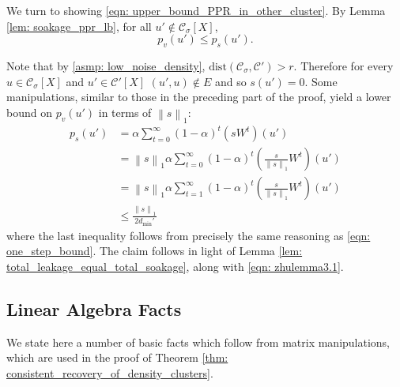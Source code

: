 \documentclass[11pt,twoside]{article}
\newcommand{\norm}[1]{\left\lVert#1\right\rVert}
\newcommand{\1}{\mathbf{1}}
\newcommand{\dist}{\mathrm{dist}}
\newcommand{\pbf}{p}        %
\newcommand{\Xbf}{X}             %
\newcommand{\Wbf}{W}
\newcommand{\Cset}{\mathcal{C}}
\newcommand{\Csig}{\Cset_{\sigma}}
\newcommand{\degminpr}{d_{\min}'}
\begin{document}
	We turn to showing \eqref{eqn: upper_bound_PPR_in_other_cluster}. By Lemma \ref{lem: soakage_ppr_lb}, for all $u' \not\in \Csig[\Xbf]$,
	\begin{equation*}
	\pbf_v(u') \leq \pbf_s(u').
	\end{equation*}
	
	Note that by \ref{asmp: low_noise_density}, $\dist(\Csig,\Cset') > r$. Therefore for every $u \in \Csig[\Xbf]$ and $u' \in \Cset'[\Xbf]$ $(u',u) \not\in E$ and so $s(u') = 0$. Some manipulations, similar to those in the preceding part of the proof, yield a lower bound on $\pbf_v(u')$ in terms of $\norm{s}_1$:
	\begin{align*}
	\pbf_s(u') & = \alpha \sum_{t = 0}^{\infty} (1 - \alpha)^t \left(s \Wbf^t\right)(u') \\
	& = \norm{s}_1 \alpha \sum_{t = 0}^{\infty} (1 - \alpha)^t \left(\frac{s}{\norm{s}_1} \Wbf^t\right)(u') \\
	& = \norm{s}_1 \alpha \sum_{t = 1}^{\infty} (1 - \alpha)^t \left(\frac{s}{\norm{s}_1} \Wbf^t\right)(u') \\
	& \leq \frac{\norm{s}_1}{2\degminpr}
	\end{align*}
	where the last inequality follows from precisely the same reasoning as \eqref{eqn: one_step_bound}. The claim follows in light of Lemma \ref{lem: total_leakage_equal_total_soakage}, along with \eqref{eqn: zhulemma3.1}.

\subsection{Linear Algebra Facts}
\label{sec: linalg}

We state here a number of basic facts which follow from matrix manipulations, which are used in the proof of Theorem \ref{thm: consistent_recovery_of_density_clusters}. 
\end{document}

